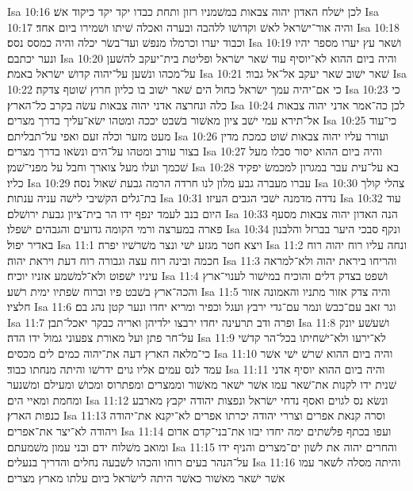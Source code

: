 Isa 10:16  לכן ישׁלח האדון יהוה צבאות במשׁמניו רזון ותחת כבדו יקד יקד כיקוד אשׁ׃
Isa 10:17  והיה אור־ישׂראל לאשׁ וקדושׁו ללהבה ובערה ואכלה שׁיתו ושׁמירו ביום אחד׃
Isa 10:18  וכבוד יערו וכרמלו מנפשׁ ועד־בשׂר יכלה והיה כמסס נסס׃
Isa 10:19  ושׁאר עץ יערו מספר יהיו ונער יכתבם׃
Isa 10:20  והיה ביום ההוא לא־יוסיף עוד שׁאר ישׂראל ופליטת בית־יעקב להשׁען על־מכהו ונשׁען על־יהוה קדושׁ ישׂראל באמת׃
Isa 10:21  שׁאר ישׁוב שׁאר יעקב אל־אל גבור׃
Isa 10:22  כי אם־יהיה עמך ישׂראל כחול הים שׁאר ישׁוב בו כליון חרוץ שׁוטף צדקה׃
Isa 10:23  כי כלה ונחרצה אדני יהוה צבאות עשׂה בקרב כל־הארץ׃
Isa 10:24  לכן כה־אמר אדני יהוה צבאות אל־תירא עמי ישׁב ציון מאשׁור בשׁבט יככה ומטהו ישׂא־עליך בדרך מצרים׃
Isa 10:25  כי־עוד מעט מזער וכלה זעם ואפי על־תבליתם׃
Isa 10:26  ועורר עליו יהוה צבאות שׁוט כמכת מדין בצור עורב ומטהו על־הים ונשׂאו בדרך מצרים׃
Isa 10:27  והיה ביום ההוא יסור סבלו מעל שׁכמך ועלו מעל צוארך וחבל על מפני־שׁמן׃
Isa 10:28  בא על־עית עבר במגרון למכמשׂ יפקיד כליו׃
Isa 10:29  עברו מעברה גבע מלון לנו חרדה הרמה גבעת שׁאול נסה׃
Isa 10:30  צהלי קולך בת־גלים הקשׁיבי לישׁה עניה ענתות׃
Isa 10:31  נדדה מדמנה ישׁבי הגבים העיזו׃
Isa 10:32  עוד היום בנב לעמד ינפף ידו הר בית־ציון גבעת ירושׁלם׃
Isa 10:33  הנה האדון יהוה צבאות מסעף פארה במערצה ורמי הקומה גדועים והגבהים ישׁפלו׃
Isa 10:34  ונקף סבכי היער בברזל והלבנון באדיר יפול׃
Isa 11:1  ויצא חטר מגזע ישׁי ונצר משׁרשׁיו יפרה׃
Isa 11:2  ונחה עליו רוח יהוה רוח חכמה ובינה רוח עצה וגבורה רוח דעת ויראת יהוה׃
Isa 11:3  והריחו ביראת יהוה ולא־למראה עיניו ישׁפוט ולא־למשׁמע אזניו יוכיח׃
Isa 11:4  ושׁפט בצדק דלים והוכיח במישׁור לענוי־ארץ והכה־ארץ בשׁבט פיו וברוח שׂפתיו ימית רשׁע׃
Isa 11:5  והיה צדק אזור מתניו והאמונה אזור חלציו׃
Isa 11:6  וגר זאב עם־כבשׂ ונמר עם־גדי ירבץ ועגל וכפיר ומריא יחדו ונער קטן נהג בם׃
Isa 11:7  ופרה ודב תרעינה יחדו ירבצו ילדיהן ואריה כבקר יאכל־תבן׃
Isa 11:8  ושׁעשׁע יונק על־חר פתן ועל מאורת צפעוני גמול ידו הדה׃
Isa 11:9  לא־ירעו ולא־ישׁחיתו בכל־הר קדשׁי כי־מלאה הארץ דעה את־יהוה כמים לים מכסים׃
Isa 11:10  והיה ביום ההוא שׁרשׁ ישׁי אשׁר עמד לנס עמים אליו גוים ידרשׁו והיתה מנחתו כבוד׃
Isa 11:11  והיה ביום ההוא יוסיף אדני שׁנית ידו לקנות את־שׁאר עמו אשׁר ישׁאר מאשׁור וממצרים ומפתרוס ומכושׁ ומעילם ומשׁנער ומחמת ומאיי הים׃
Isa 11:12  ונשׂא נס לגוים ואסף נדחי ישׂראל ונפצות יהודה יקבץ מארבע כנפות הארץ׃
Isa 11:13  וסרה קנאת אפרים וצררי יהודה יכרתו אפרים לא־יקנא את־יהודה ויהודה לא־יצר את־אפרים׃
Isa 11:14  ועפו בכתף פלשׁתים ימה יחדו יבזו את־בני־קדם אדום ומואב משׁלוח ידם ובני עמון משׁמעתם׃
Isa 11:15  והחרים יהוה את לשׁון ים־מצרים והניף ידו על־הנהר בעים רוחו והכהו לשׁבעה נחלים והדריך בנעלים׃
Isa 11:16  והיתה מסלה לשׁאר עמו אשׁר ישׁאר מאשׁור כאשׁר היתה לישׂראל ביום עלתו מארץ מצרים׃
